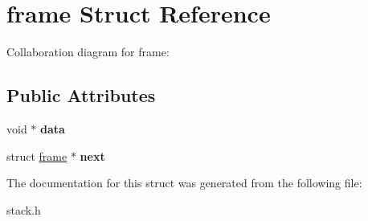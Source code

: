 \hypertarget{structframe}{}\section{frame Struct Reference}
\label{structframe}


Collaboration diagram for frame\+:
\subsection*{Public Attributes}
\begin{DoxyCompactItemize}
\item 
\mbox{\label{structframe_a278fcf623a06ff12eba534c5a10f7f48}} 
void $\ast$ {\bfseries data}
\item 
\mbox{\label{structframe_a23c908c0892e1329c82f3673e1d659eb}} 
struct \hyperlink{structframe}{frame} $\ast$ {\bfseries next}
\end{DoxyCompactItemize}


The documentation for this struct was generated from the following file\+:\begin{DoxyCompactItemize}
\item 
stack.\+h\end{DoxyCompactItemize}
